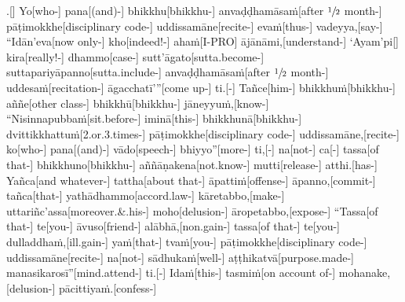 \documentclass[12pt]{article}
\begin{document}
\begin{paracol}{2}
\begin{column}
\switchcolumn


\begin{flushleft}
.[] Yo[who-] pana[(and)-] bhikkhu[bhikkhu-] anvaḍḍhamāsaṁ[after $\sfrac{1}{2}$ month-] pāṭimokkhe[disciplinary code-] uddissamāne[recite-] evaṁ[thus-] vadeyya,[say-] “Idān’eva[now only-] kho[indeed!-] ahaṁ[I-\PERS PRO{}] ājānāmi,[understand-] ‘Ayam’pi[] kira[really!-] dhammo[case-] sutt’āgato[sutta.become-] suttapariyāpanno[sutta.include-] anvaḍḍhamāsaṁ[after $\sfrac{1}{2}$ month-] uddesaṁ[recitation-] āgacchatī’”[come up-] ti.[-\NUL{\GMU{}}] Tañce[him-] bhikkhuṁ[bhikkhu-] aññe[other class-] bhikkhū[bhikkhu-] jāneyyuṁ,[know-] “Nisinnapubbaṁ[sit.before-] iminā[this-] bhikkhunā[bhikkhu-] dvittikkhattuṁ[2.or.3.times-] pāṭimokkhe[disciplinary code-] uddissamāne,[recite-] ko[who-] pana[(and)-] vādo[speech-] bhiyyo”[more-] ti,[-\NUL{\GMU{}}] na[not-] ca[-\NUL{\GMU{}}] tassa[of that-] bhikkhuno[bhikkhu-] aññāṇakena[not.know-] mutti[release-] atthi.[has-] Yañca[and whatever-\NUL{\GMU{}}] tattha[about that-] āpattiṁ[offense-] āpanno,[commit-] tañca[that-] yathādhammo[accord.law-] kāretabbo,[make-] uttariñc’assa[moreover.\&.his-] moho[delusion-] āropetabbo,[expose-] “Tassa[of that-] te[you-] āvuso[friend-] alābhā,[non.gain-] tassa[of that-] te[you-] dulladdhaṁ,[ill.gain-] yaṁ[that-] tvaṁ[you-] pāṭimokkhe[disciplinary code-] uddissamāne[recite-] na[not-] sādhukaṁ[well-] aṭṭhikatvā[purpose.made-] manasikarosī”[mind.attend-] ti.[-\NUL{\GMU{}}] Idaṁ[this-] tasmiṁ[on account of-] mohanake,[delusion-] pācittiyaṁ.[confess-]
\endgl
\switchcolumn*
\end{flushleft}



\end{column}
\end{paracol}
\end{document}
